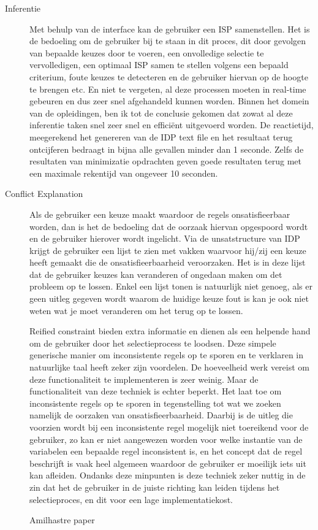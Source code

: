 \begin{description}
\item [Inferentie] Met behulp van de interface kan de gebruiker een ISP samenstellen. Het is de bedoeling om de gebruiker bij te staan in dit proces, dit door gevolgen van bepaalde keuzes door te voeren, een onvolledige selectie te vervolledigen, een optimaal ISP samen te stellen volgens een bepaald criterium, foute keuzes te detecteren en de gebruiker hiervan op de hoogte te brengen etc. En niet te vergeten, al deze processen moeten in real-time gebeuren en dus zeer snel afgehandeld kunnen worden. Binnen het domein van de opleidingen, ben ik tot de conclusie gekomen dat zowat al deze inferentie taken snel zeer snel en effici\"{e}nt uitgevoerd worden. De reactietijd, meegerekend het genereren van de IDP text file en het resultaat terug ontcijferen bedraagt in bijna alle gevallen minder dan 1 seconde. Zelfs de resultaten van minimizatie opdrachten geven goede resultaten terug met een maximale rekentijd van ongeveer 10 seconden. 

\item [Conflict Explanation] Als de gebruiker een keuze maakt waardoor de regels onsatisfieerbaar worden, dan is het de bedoeling dat de oorzaak hiervan opgespoord wordt en de gebruiker hierover wordt ingelicht. Via de unsatstructure van IDP krijgt de gebruiker een lijst te zien met vakken waarvoor hij/zij een keuze heeft gemaakt die de onsatisfieerbaarheid veroorzaken. Het is in deze lijst dat de gebruiker keuzes kan veranderen of ongedaan maken om det probleem op te lossen. Enkel een lijst tonen is natuurlijk niet genoeg, als er geen uitleg gegeven wordt waarom de huidige keuze fout is kan je ook niet weten wat je moet veranderen om het terug op te lossen. 

Reified constraint bieden extra informatie en dienen als een helpende hand om de gebruiker door het selectieprocess te loodsen. Deze simpele generische manier om inconsistente regels op te sporen en te verklaren in natuurlijke taal heeft zeker zijn voordelen. De hoeveelheid werk vereist om deze functionaliteit te implementeren is zeer weinig. Maar de functionaliteit van deze techniek is echter beperkt. Het laat toe om inconsistente regels op te sporen in tegenstelling tot wat we zoeken namelijk de oorzaken van onsatisfieerbaarheid. Daarbij is de uitleg die voorzien wordt bij een inconsistente regel mogelijk niet toereikend voor de gebruiker, zo kan er niet aangewezen worden voor welke instantie van de variabelen een bepaalde regel inconsistent is, en het concept dat de regel beschrijft is vaak heel algemeen waardoor de gebruiker er moeilijk iets uit kan afleiden. Ondanks deze minpunten is deze techniek zeker nuttig in de zin dat het de gebruiker in de juiste richting kan leiden tijdens het selectieproces, en dit voor een lage implementatiekost.

Amilhastre paper
\end{description}